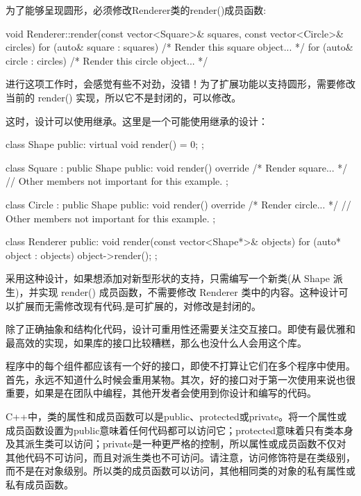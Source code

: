 为了能够呈现圆形，必须修改Renderer类的render()成员函数:

\begin{cpp}
void Renderer::render(const vector<Square>& squares,
    const vector<Circle>& circles)
{
    for (auto& square : squares) { /* Render this square object... */ }
    for (auto& circle : circles) { /* Render this circle object... */ }
}
\end{cpp}

进行这项工作时，会感觉有些不对劲，没错！为了扩展功能以支持圆形，需要修改当前的 render() 实现，所以它不是封闭的，可以修改。

这时，设计可以使用继承。这里是一个可能使用继承的设计：

\begin{cpp}
class Shape
{
    public:
    virtual void render() = 0;
};

class Square : public Shape
{
    public:
    void render() override { /* Render square... */ }
    // Other members not important for this example.
};

class Circle : public Shape
{
    public:
    void render() override { /* Render circle... */ }
    // Other members not important for this example.
};

class Renderer
{
    public:
    void render(const vector<Shape*>& objects)
    {
        for (auto* object : objects) { object->render(); }
    }
};
\end{cpp}

采用这种设计，如果想添加对新型形状的支持，只需编写一个新类(从 Shape 派生)，并实现 render() 成员函数，不需要修改 Renderer 类中的内容。这种设计可以扩展而无需修改现有代码,是可扩展的，对修改是封闭的。


除了正确抽象和结构化代码，设计可重用性还需要关注交互接口。即使有最优雅和最高效的实现，如果库的接口比较糟糕，那么也没什么人会用这个库。

程序中的每个组件都应该有一个好的接口，即使不打算让它们在多个程序中使用。首先，永远不知道什么时候会重用某物。其次，好的接口对于第一次使用来说也很重要，如果是在团队中编程，其他开发者会使用到你设计和编写的代码。

C++中，类的属性和成员函数可以是public、protected或private。将一个属性或成员函数设置为public意味着任何代码都可以访问它；protected意味着只有类本身及其派生类可以访问；private是一种更严格的控制，所以属性或成员函数不仅对其他代码不可访问，而且对派生类也不可访问。请注意，访问修饰符是在类级别，而不是在对象级别。所以类的成员函数可以访问，其他相同类的对象的私有属性或私有成员函数。

